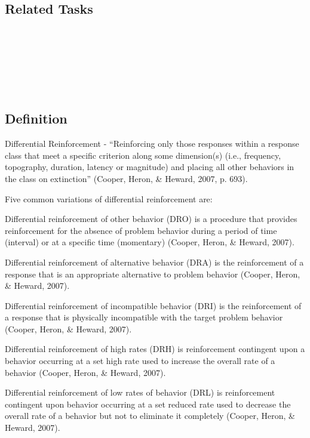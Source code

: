 \subsection{Related Tasks}
\fourbFour{}\\
\fourcOne{}\\
\fourdTwo{}\\
\fourdTwentyOne{}\\
\fourjTwo{}\\
%
%
%
%
%
%        
%
\section[\fourdTwentyOne{}]{\fourdTwentyOne{}%
              }
\subsection{Definition} 
Differential Reinforcement - ``Reinforcing only those responses within a response class that meet a specific criterion along some dimension(s) (i.e., frequency, topography, duration, latency or magnitude) and placing all other behaviors in the class on extinction'' (Cooper, Heron, \& Heward, 2007, p. 693).

Five common variations of differential reinforcement are: 

Differential reinforcement of other behavior (DRO) is a procedure that provides reinforcement for the absence of problem behavior during a period of time (interval) or at a specific time (momentary) (Cooper, Heron, \& Heward, 2007).

Differential reinforcement of alternative behavior (DRA) is the reinforcement of a response that is an appropriate alternative to problem behavior (Cooper, Heron, \& Heward, 2007).

Differential reinforcement of incompatible behavior (DRI) is the reinforcement of a response that is physically incompatible with the target problem behavior (Cooper, Heron, \& Heward, 2007). 

Differential reinforcement of high rates (DRH) is reinforcement contingent upon a behavior occurring at a set high rate used to increase the overall rate of a behavior (Cooper, Heron, \& Heward, 2007).

Differential reinforcement of low rates of behavior (DRL) is reinforcement contingent upon behavior occurring at a set reduced rate used to decrease the overall rate of a behavior but not to eliminate it completely (Cooper, Heron, \& Heward, 2007).
%
